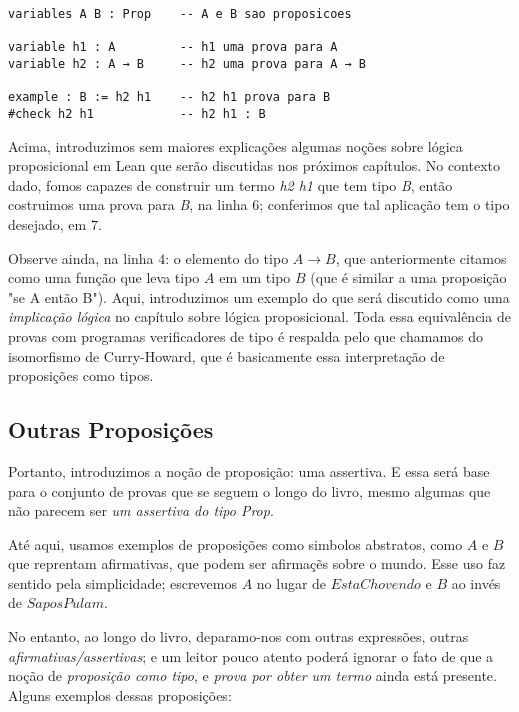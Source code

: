 \vspace{5mm}
\begin{lstlisting}
variables A B : Prop    -- A e B sao proposicoes

variable h1 : A         -- h1 uma prova para A
variable h2 : A → B     -- h2 uma prova para A → B

example : B := h2 h1    -- h2 h1 prova para B
#check h2 h1            -- h2 h1 : B
\end{lstlisting}
\vspace{5mm}

\noindent Acima, introduzimos sem maiores explicações algumas noções sobre lógica proposicional em Lean que serão discutidas nos próximos capítulos. No contexto dado, fomos capazes de construir um termo \textit{h2 h1} que tem tipo \textit{B}, então costruimos uma prova para \textit{B}, na linha $6$; conferimos que tal aplicação tem o tipo desejado, em $7$.

Observe ainda, na linha $4$: o elemento do tipo $A → B$, que anteriormente citamos como uma função que leva tipo $A$ em um tipo $B$ (que é similar a uma proposição "se A então B").
Aqui, introduzimos um exemplo do que será discutido como uma \textit{implicação lógica} no capítulo sobre lógica proposicional. Toda essa equivalência de provas com programas verificadores de tipo é respalda pelo que chamamos do isomorfismo de Curry-Howard, que é basicamente essa interpretação de proposições como tipos.

\subsection{Outras Proposições}
Portanto, introduzimos a noção de proposição: uma assertiva. E essa será base para o conjunto de provas que se seguem o longo do livro, mesmo algumas que não parecem ser \textit{um assertiva do tipo Prop}.

Até aqui, usamos exemplos de proposições como simbolos abstratos, como $A$ e $B$ que reprentam afirmativas, que podem ser afirmaçẽs sobre o mundo. Esse uso faz sentido pela simplicidade; escrevemos $A$ no lugar de $EstaChovendo$ e $B$ ao invés de $SaposPulam$.

No entanto, ao longo do livro, deparamo-nos com outras expressões, outras \textit{afirmativas/assertivas}; e um leitor pouco atento poderá ignorar o fato de que a noção de \textit{proposição como tipo}, e \textit{prova por obter um termo} ainda está presente. Alguns exemplos dessas proposições:

